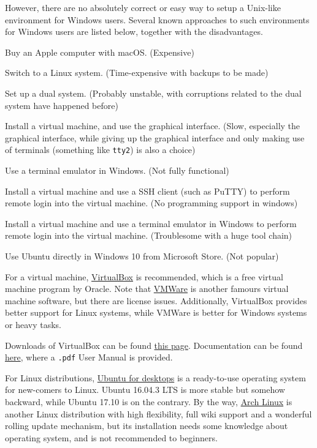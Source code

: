 \documentclass[english]{../TeXTemplate/pkupaper}
\begin{document}
However, there are no absolutely correct or easy way to setup a Unix-like environment for Windows users. Several known approaches to such environments for Windows users are listed below, together with the disadvantages.
\begin{partlist}
\item Buy an Apple computer with macOS. (Expensive)
\item Switch to a Linux system. (Time-expensive with backups to be made)
\item Set up a dual system. (Probably unstable, with corruptions related to the dual system have happened before)
\item Install a virtual machine, and use the graphical interface. (Slow, especially the graphical interface, while giving up the graphical interface and only making use of terminals (something like \verb"tty2") is also a choice)
\item Use a terminal emulator in Windows. (Not fully functional)
\item Install a virtual machine and use a SSH client (such as PuTTY) to perform remote login into the virtual machine. (No programming support in windows)
\item Install a virtual machine and use a terminal emulator in Windows to perform remote login into the virtual machine. (Troublesome with a huge tool chain)
\item Use Ubuntu directly in Windows 10 from Microsoft Store. (Not popular)
\end{partlist}

For a virtual machine, \href{https://www.virtualbox.org/}{VirtualBox} is recommended, which is a free virtual machine program by Oracle. Note that \href{https://www.vmware.com/}{VMWare} is another famours virtual machine software, but there are license issues. Additionally, VirtualBox provides better support for Linux systems, while VMWare is better for Windows systems or heavy tasks.

Downloads of VirtualBox can be found \href{https://www.virtualbox.org/wiki/Downloads}{this page}. Documentation can be found \href{https://www.virtualbox.org/wiki/Documentation}{here}, where a \verb".pdf" User Manual is provided.

For Linux distributions, \href{https://www.ubuntu.com/desktop}{Ubuntu for desktops} is a ready-to-use operating system for new-comers to Linux. Ubuntu 16.04.3 LTS is more stable but somehow backward, while Ubuntu 17.10 is on the contrary. By the way, \href{https://www.archlinux.org/}{Arch Linux} is another Linux distribution with high flexibility, full wiki support and a wonderful rolling update mechanism, but its installation needs some knowledge about operating system, and is not recommended to beginners.
\end{document}
